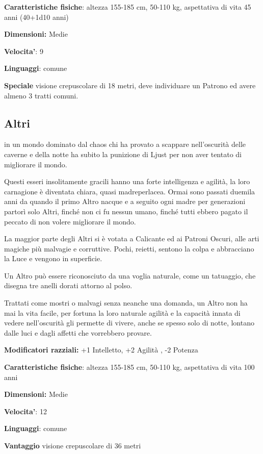 \documentclass[a4paper,11pt,twoside,openany]{book}
\begin{document}
\textbf{Caratteristiche fisiche}: altezza 155-185 cm, 50-110 kg, aspettativa di vita 45 anni (40+1d10 anni)

\textbf{Dimensioni:} Medie

\textbf{Velocita'}: 9

\textbf{Linguaggi}: comune

\textbf{Speciale} visione crepuscolare di 18 metri, deve individuare un Patrono ed avere almeno 3 tratti comuni.

\subsection{Altri}

\label{altri}

in un mondo dominato dal chaos chi ha provato a scappare nell'oscurità delle caverne e della notte ha subito la punizione di Ljust per non aver tentato di migliorare il mondo.

Questi esseri insolitamente gracili hanno una forte intelligenza e agilità, la loro carnagione è diventata chiara, quasi madreperlacea. Ormai sono passati duemila anni da quando il primo Altro nacque e a seguito ogni madre per generazioni partorì solo Altri, finché non ci fu nessun umano, finché tutti ebbero pagato il peccato di non volere migliorare il mondo.

La maggior parte degli Altri si è votata a Calicante ed ai Patroni Oscuri, alle arti magiche più malvagie e corruttive. Pochi, reietti, sentono la colpa e abbracciano la Luce e vengono in superficie.

Un Altro può essere riconosciuto da una voglia naturale, come un tatuaggio, che disegna tre anelli dorati attorno al polso.

Trattati come mostri o malvagi senza neanche una domanda, un Altro non ha mai la vita facile, per fortuna la loro naturale agilità e la capacità innata di vedere nell'oscurità gli permette di vivere, anche se spesso solo di notte, lontano dalle luci e dagli affetti che vorrebbero provare.

\textbf{Modificatori razziali:} +1 Intelletto, +2 Agilità , -2 Potenza

\textbf{Caratteristiche fisiche}: altezza 155-185 cm, 50-110 kg, aspettativa
di vita 100 anni

\textbf{Dimensioni:} Medie

\textbf{Velocita'}: 12

\textbf{Linguaggi}: comune

\textbf{Vantaggio} visione crepuscolare di 36 metri
\end{document}
